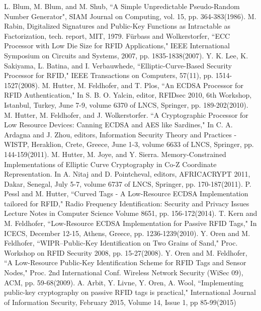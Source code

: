 \documentclass{article}
\begin{document}
\begin{thebibliography}{}
L. Blum, M. Blum, and M. Shub, 
``A Simple Unpredictable Pseudo-Random Number Generator", SIAM Journal on Computing, vol. 15, pp. 364-383(1986).
M. Rabin, Digitalized Signatures and Public-Key Functions as Intractable
as Factorization, tech. report, MIT, 1979. 
F\"urbass and Wolkerstorfer, ``ECC Processor with Low Die Size for RFID Applications," 
IEEE International Symposium on Circuits and Systems, 2007, pp. 1835-1838(2007). 
 Y. K. Lee, K. Sakiyama, L. Batina, and I. Verbauwhede, 
``Elliptic-Curve-Based Security Processor for RFID," IEEE Transactions on Computers, 57(11), pp. 1514-1527(2008).
 M. Hutter, M. Feldhofer, and T. Plos, ``An ECDSA Processor for RFID Authentication," 
In S. B. O. Yalcin, editor, RFIDsec 2010, 6th Workshop, Istanbul, Turkey,
June 7-9, volume 6370 of LNCS, Springer, pp. 189-202(2010).
 M. Hutter, M. Feldhofer, and J. Wolkerstorfer. ``A Cryptographic Processor for Low Resource
Devices: Canning ECDSA and AES like Sardines," In C. A. Ardagna and
J. Zhou, editors, Information Security Theory and Practices - WISTP, Heraklion,
Crete, Greece, June 1-3, volume 6633 of LNCS, Springer, pp. 144-159(2011).
 M. Hutter, M. Joye, and Y. Sierra. Memory-Constrained Implementations of Elliptic
Curve Cryptography in Co-Z Coordinate Representation. In A. Nitaj and
D. Pointcheval, editors, AFRICACRYPT 2011, Dakar, Senegal, July 5-7, volume
6737 of LNCS, Springer, pp. 170-187(2011).
P. Pessl and M. Hutter, ``Curved Tags - A Low-Resource ECDSA Implementation tailored for RFID," 
Radio Frequency Identification: Security and Privacy Issues
Lecture Notes in Computer Science Volume 8651, pp. 156-172(2014).
 T. Kern and M. Feldhofer, ``Low-Resource ECDSA Implementation for Passive RFID Tags," 
In ICECS, December 12-15, Athens, Greece, pp. 1236-1239(2010).
Y. Oren and M. Feldhofer, ``WIPR--Public-Key Identification on
Two Grains of Sand," Proc. Workshop on RFID Security 2008, pp. 15-27(2008).
 Y. Oren and M. Feldhofer, ``A Low-Resource Public-Key Identification
Scheme for RFID Tags and Sensor Nodes," Proc. 2nd International Conf.
Wireless Network Security (WiSec 09), ACM, pp. 59-68(2009).
A. Arbit, Y. Livne, Y. Oren, A. Wool, ``Implementing public-key cryptography on passive RFID tags is practical," 
International Journal of Information Security, February 2015, Volume 14, Issue 1, pp 85-99(2015)

\end{thebibliography}
\end{document}
